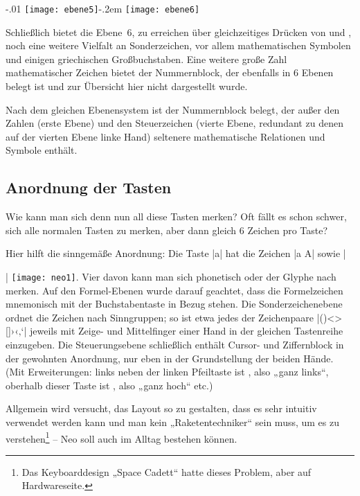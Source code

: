 \documentclass[ngerman]{dtk}
\newcommand{\taste}[1]{\makebox{\textsf{#1}}}
\begin{document}
{\begin{center}
\leavevmode\kern-.01\textwidth%
\texttt{[image: ebene5]}\kern-.2em%
\texttt{[image: ebene6]}
\end{center}

Schließlich bietet die Ebene~6, zu erreichen über gleichzeitiges Drücken von \taste{Mod 3} und \taste{Mod 4}, noch eine weitere Vielfalt an Sonderzeichen, vor allem mathematischen Symbolen und einigen griechischen Großbuchstaben. Eine weitere große Zahl mathematischer Zeichen bietet der Nummernblock, der ebenfalls in 6 Ebenen belegt ist und zur Übersicht hier nicht dargestellt wurde.

Nach dem gleichen Ebenensystem ist der Nummernblock belegt, der außer den Zahlen (erste Ebene) und den Steuerzeichen (vierte Ebene, redundant zu denen auf der vierten Ebene linke Hand) seltenere mathematische Relationen und Symbole enthält.

\subsection{Anordnung der Tasten}
Wie kann man sich denn nun all diese Tasten merken? Oft fällt es schon schwer, sich alle normalen Tasten zu merken, aber dann gleich 6 Zeichen pro Taste?

Hier hilft die sinngemäße Anordnung: Die Taste |a| hat die Zeichen |a A| sowie |{| \texttt{[image: neo1]}. Vier davon kann man sich phonetisch oder der Glyphe nach merken. Auf den Formel-Ebenen wurde darauf geachtet, dass die Formelzeichen mnemonisch mit der Buchstabentaste in Bezug stehen.  Die Sonderzeichenebene ordnet die Zeichen nach Sinngruppen; so ist etwa jedes der Zeichenpaare |()<>{}[]›‹‚‘| jeweils mit Zeige- und Mittelfinger einer Hand in der gleichen Tastenreihe einzugeben.  Die Steuerungsebene schließlich enthält Cursor- und Ziffernblock in der gewohnten Anordnung, nur eben in der Grundstellung der beiden Hände. (Mit Erweiterungen: links neben der linken Pfeiltaste ist \taste{Pos 1}, also „ganz links“, oberhalb dieser Taste ist \taste{Bild hoch}, also „ganz hoch“ etc.)

Allgemein wird versucht, das Layout so zu gestalten, dass es sehr intuitiv verwendet werden kann und man kein „Raketentechniker“ sein muss, um es zu verstehen\footnote{Das Keyboarddesign „Space Cadett“ hatte dieses Problem, aber auf Hardwareseite.} – Neo soll auch im Alltag bestehen können.

}}
\end{document}
